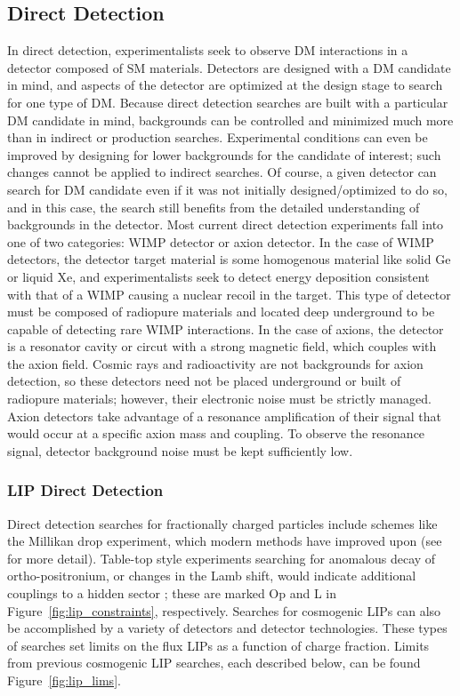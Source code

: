 \subsection{Direct Detection}
In direct detection, experimentalists seek to observe \ac{DM} interactions in a detector composed of \ac{SM} materials. Detectors are designed with a \ac{DM} candidate in mind, and aspects of the detector are optimized at the design stage to search for one type of \ac{DM}. Because direct detection searches are built with a particular \ac{DM} candidate in mind, backgrounds can be controlled and minimized much more than in indirect or production searches. Experimental conditions can even be improved by designing for lower backgrounds for the candidate of interest; such changes cannot be applied to indirect searches. Of course, a given detector can search for \ac{DM} candidate even if it was not initially designed/optimized to do so, and in this case, the search still benefits from the detailed understanding of backgrounds in the detector. Most current direct detection experiments fall into one of two categories: \ac{WIMP} detector or axion detector. In the case of \ac{WIMP} detectors, the detector target material is some homogenous material like solid Ge or liquid Xe, and experimentalists seek to detect energy deposition consistent with that of a \ac{WIMP} causing a nuclear recoil in the target. This type of detector must be composed of radiopure materials and located deep underground to be capable of detecting rare \ac{WIMP} interactions. In the case of axions, the detector is a resonator cavity or circut with a strong magnetic field, which couples with the axion field. Cosmic rays and radioactivity are not backgrounds for axion detection, so these detectors need not be placed underground or built of radiopure materials; however, their electronic noise must be strictly managed. Axion detectors take advantage of a resonance amplification of their signal that would occur at a specific axion mass and coupling. To observe the resonance signal, detector background noise must be kept sufficiently low. 

\subsubsection{LIP Direct Detection}
Direct detection searches for fractionally charged particles include schemes like the Millikan drop experiment, which modern methods have improved upon (see \cite{Perl2009} for more detail). Table-top style experiments searching for anomalous decay of ortho-positronium, or changes in the Lamb shift, would indicate additional couplings to a hidden sector \cite{Perl2009}; these are marked Op and L in Figure~\ref{fig:lip_constraints}, respectively. Searches for cosmogenic \ac{LIP}s can also be accomplished by a variety of detectors and detector technologies. These types of searches set limits on the flux \ac{LIP}s as a function of charge fraction. Limits from previous cosmogenic \ac{LIP} searches, each described below, can be found Figure~\ref{fig:lip_lims}.

